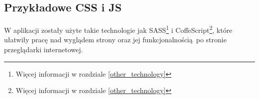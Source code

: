     


    \subsection{Przykładowe CSS i JS}
      W aplikacji zostały użyte takie technologie jak SASS\footnote{Więcej informacji w rozdziale \ref{other_technology}} i CoffeScript\footnote{Więcej informacji w rozdziale \ref{other_technology}}, które ułatwiły pracę nad wyglądem strony oraz jej funkcjonalnością po stronie przeglądarki internetowej.

